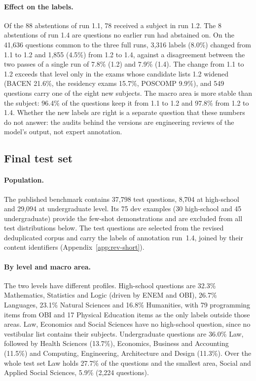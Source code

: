 \paragraph{Effect on the labels.} Of the 88 abstentions of run 1.1, 78
received a subject in run 1.2. The 8 abstentions of run 1.4 are questions no
earlier run had abstained on. On the 41,636 questions common to the three
full runs, 3,316 labels (8.0\%) changed from 1.1 to 1.2 and 1,855 (4.5\%)
from 1.2 to 1.4, against a disagreement between the two passes of a single
run of 7.8\% (1.2) and 7.9\% (1.4). The change from 1.1 to 1.2 exceeds that
level only in the exams whose candidate lists 1.2 widened (BACEN 21.6\%, the
residency exams 15.7\%, POSCOMP 9.9\%), and 549 questions carry one of the
eight new subjects. The macro area is more stable than the subject: 96.4\% of
the questions keep it from 1.1 to 1.2 and 97.8\% from 1.2 to 1.4. Whether the
new labels are right is a separate question that these numbers do not answer:
the audits behind the versions are engineering reviews of the model's output,
not expert annotation.

\subsection{Final test set}
\label{app:ka-short-dataset}

\paragraph{Population.} The published benchmark contains 37,798 test
questions, 8,704 at high-school and 29,094 at undergraduate level. Its 75 dev
examples (30 high-school and 45 undergraduate) provide the few-shot
demonstrations and are excluded from all test distributions below.
The test questions are selected from the revised deduplicated corpus and
carry the labels of annotation run~1.4, joined by their content identifiers
(Appendix~\ref{app:rev-short}).

\paragraph{By level and macro area.} The two levels have different profiles.
High-school questions are 32.3\% Mathematics, Statistics and Logic
(driven by ENEM and OBI), 26.7\% Languages, 23.1\% Natural Sciences and
16.8\% Humanities, with 79 programming items from OBI and 17 Physical
Education items as the only labels outside those areas. Law, Economics and
Social Sciences have no high-school question, since no vestibular list
contains their subjects. Undergraduate questions are 36.0\% Law,
followed by Health Sciences (13.7\%), Economics, Business and Accounting
(11.5\%) and Computing, Engineering, Architecture and Design (11.3\%). Over
the whole test set Law holds 27.7\% of the questions and the smallest area,
Social and Applied Social Sciences, 5.9\% (2,224 questions).

